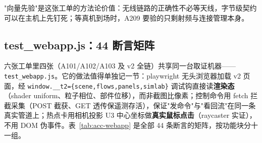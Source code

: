 "向量先验"是这张工单的方法论价值：无线链路的正确性不必等天线，字节级契约可以在主机上先钉死；等真机到场时，A209 要验的只剩射频与连接管理本身。

\subsection{test\_webapp.js：44 断言矩阵}
\label{sec:acc-matrix}

六张工单里四张（A101/A102/A103 及 v2 全链）共享同一台取证机器——\texttt{test\_webapp.js}。它的做法值得单独记一节：playwright 无头浏览器加载 v2 页面，经 \texttt{window.\_\_t2=\{scene,flows,panels,simlab\}} 调试钩直接读\textbf{渲染态}（shader uniform、粒子相位、部件位移），而非截图比像素；控制命令用 fetch 拦截采集（POST 截获、GET 透传保遥测存活），保证"发命令"与"看回流"在同一条真实管道上；热点卡用相机投影 U3 中心坐标做\textbf{真实鼠标点击}（raycaster 实证），不用 DOM 伪事件。表~\ref{tab:acc-webapp} 是全部 44 条断言的矩阵，按功能块分十一组。

